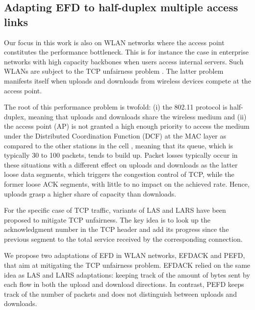 \documentclass[preprint,12pt]{elsarticle}
\begin{document}
 
\subsection{Adapting EFD to half-duplex multiple access links} \label{subsec:halfdup}

Our focus in this work is also on WLAN networks where the access point constitutes the performance bottleneck. This is for instance the case in enterprise networks with high capacity backbones when users access internal servers. Such WLANs are subject to the TCP unfairness problem \cite{Pilosof03understandingtcp}. The latter problem manifests itself when uploads and downloads from wireless devices compete at the access point. 

%
The root of this performance problem is twofold: (i) the 802.11 protocol is half-duplex, meaning that uploads and downloads share the wireless medium and (ii) the access point (AP) is not granted a high enough priority to access the medium under the Distributed Coordination Function (DCF) at the MAC layer as compared to the other stations in the cell \cite{Pilosof03understandingtcp}, meaning that its queue, which is typically 30 to 100 packets, tends to build up. Packet losses typically occur in these situations with a different effect on uploads and downloads as the latter loose data segments, which triggers the congestion control of TCP, while the former loose ACK segments, with little to no impact on the achieved rate. Hence, uploads grasp a higher share of capacity than downloads.

For the specific case of TCP traffic, variants of LAS and LARS \cite{Keller2008Improving, heusse2011least} have been proposed to mitigate TCP unfairness. The key idea  is to look up the acknowledgment number in the TCP header and add its progress since the previous segment to the  total service received  by the corresponding connection. %
%

We propose two adaptations of EFD in WLAN networks, EFDACK and PEFD,  that aim at mitigating the TCP unfairness problem. EFDACK relied on the same idea as LAS and LARS adaptations: keeping  track of the amount of bytes sent by each flow in both the upload and download directions. %
In contrast, PEFD keeps track of the number of packets and does not distinguish between uploads and downloads. 
\end{document}
